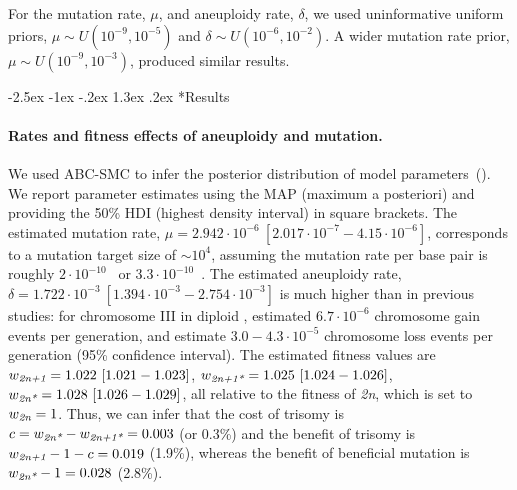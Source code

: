 \documentclass[12pt]{extarticle}
\makeatletter
\renewcommand\section{\@startsection {section}{1}{\z@}%
     {-2.5ex \@plus -1ex \@minus -.2ex}%
     {1.3ex \@plus.2ex}%
    {\Large\bfseries}}
\newcommand{\euwt}{\emph{2n}}
\newcommand{\anwt}{\emph{2n+1}}
\newcommand{\eumt}{\emph{2n*}}
\newcommand{\anmt}{\emph{2n+1*}}
\makeatother
\begin{document}
For the mutation rate, $\mu$, and aneuploidy rate, $\delta$, we used uninformative uniform priors, $\mu \sim \mathit{U}(10^{-9},10^{-5})$ and $\delta \sim \mathit{U}(10^{-6},10^{-2})$. A wider mutation rate prior, $\mu \sim \mathit{U}(10^{-9},10^{-3})$, produced similar results.

\section*{Results}

\paragraph{Rates and fitness effects of aneuploidy and mutation.} 
We used ABC-SMC to infer the posterior distribution of model parameters~(). 
We report parameter estimates using the MAP (maximum a posteriori) and providing the 50\% HDI (highest density interval) in square brackets.
The estimated mutation rate, $\mu=2.942\cdot10^{-6}\ [2.017\cdot10^{-7}-4.15\cdot10^{-6}]$, corresponds to a mutation target size of $\sim 10^{4}$, assuming the mutation rate per base pair is roughly $2\cdot10^{-10}$~\citep{Zhu2014} or $3.3\cdot10^{-10}$~\citep{Lynch2008}.
The estimated aneuploidy rate, $\delta=1.722\cdot10^{-3}\ [1.394\cdot10^{-3}-2.754\cdot10^{-3}]$ is much higher than in previous studies: for chromosome III in diploid \yeast, \citet{Zhu2014} estimated $6.7\cdot10^{-6}$ chromosome gain events per generation, and \citet{Kumaran2013} estimate $3.0-4.3\cdot10^{-5}$ chromosome loss events per generation (95\% confidence interval).
The estimated fitness values are $w_{\anwt}=1.022\ [1.021-1.023]$,
$w_{\anmt}=1.025\ [1.024-1.026]$,
$w_{\eumt}=1.028\ [1.026-1.029]$, all relative to the fitness of \euwt, which is set to $w_{\euwt}=1$. 
Thus, we can infer that the cost of trisomy is $c = w_{\eumt}-w_{\anmt} = 0.003$ (or 0.3\%) and the benefit of trisomy is $w_{\anwt}-1-c=0.019$ (1.9\%), whereas the benefit of beneficial mutation is $w_{\eumt}-1=0.028$ (2.8\%).
\end{document}
